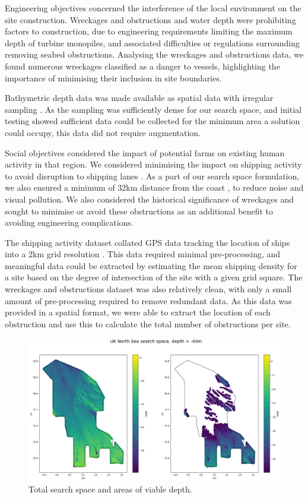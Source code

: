 \documentclass[preprint,12pt]{elsarticle}
\begin{document}
Engineering objectives concerned the interference of the local environment on the site construction. Wreckages and obstructions \cite{hong2011offshore} and water depth \cite{punt2009spatial} were prohibiting factors to construction, due to engineering requirements limiting the maximum depth of turbine monopiles, and associated difficulties or regulations surrounding removing seabed obstructions. Analysing the wreckages and obstructions data, we found numerous wreckages classified as a danger to vessels, highlighting the importance of minimising their inclusion in site boundaries.

Bathymetric depth data was made available as spatial data with irregular sampling \cite{2022b}. As the sampling was sufficiently dense for our search space, and initial testing showed sufficient data could be collected for the minimum area a solution could occupy, this data did not require augmentation.

Social objectives considered the impact of potential farms on existing human activity in that region. We considered minimising the impact on shipping activity to avoid disruption to shipping lanes \cite{kim2010review}. As a part of our search space formulation, we also ensured a minimum of 32km distance from the coast \cite{punt2009spatial}, to reduce noise and visual pollution. We also considered the historical significance of wreckages and sought to minimise or avoid these obstructions as an additional benefit to avoiding engineering complications.

The shipping activity dataset collated GPS data tracking the location of ships into a 2km grid resolution \cite{2017}. This data required minimal pre-processing, and meaningful data could be extracted by estimating the mean shipping density for a site based on the degree of intersection of the site with a given grid square. The wreckages and obstructions dataset \cite{2022} was also relatively clean, with only a small amount of pre-processing required to remove redundant data. As this data was provided in a spatial format, we were able to extract the location of each obstruction and use this to calculate the total number of obstructions per site.

\newpage
\begin{figure}[h!]
    \includegraphics[width=\textwidth,height=\textheight,keepaspectratio]{images/viable_bathymetry.png}
    \caption{Total search space and areas of viable depth.}
    \label{fig:viable_bathymetry}
\end{figure}
\end{document}
